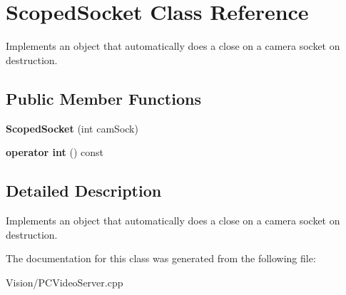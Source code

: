\hypertarget{classScopedSocket}{
\section{ScopedSocket Class Reference}
\label{classScopedSocket}
}


Implements an object that automatically does a close on a camera socket on destruction.  


\subsection*{Public Member Functions}
\begin{DoxyCompactItemize}
\item 
\hypertarget{classScopedSocket_a07f08fe410cd2a71cb91aad9fecc42b2}{
{\bfseries ScopedSocket} (int camSock)}
\label{classScopedSocket_a07f08fe410cd2a71cb91aad9fecc42b2}

\item 
\hypertarget{classScopedSocket_a8f48df6bf73fcaf5ad3caf7a92e65b3e}{
{\bfseries operator int} () const }
\label{classScopedSocket_a8f48df6bf73fcaf5ad3caf7a92e65b3e}

\end{DoxyCompactItemize}


\subsection{Detailed Description}
Implements an object that automatically does a close on a camera socket on destruction. 

The documentation for this class was generated from the following file:\begin{DoxyCompactItemize}
\item 
Vision/PCVideoServer.cpp\end{DoxyCompactItemize}

